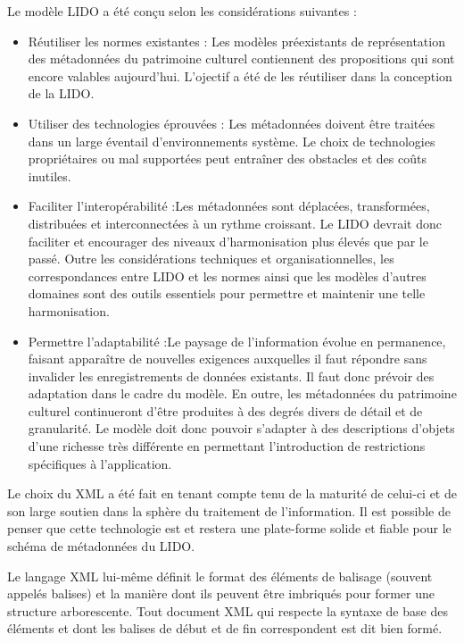 Le modèle LIDO a été conçu selon les considérations suivantes :

\begin{itemize}
    \item Réutiliser les normes existantes : Les modèles préexistants de représentation des métadonnées du patrimoine culturel contiennent des propositions qui sont encore valables aujourd'hui. L'ojectif  a été de les réutiliser dans la conception de la LIDO. 
    \item Utiliser des technologies éprouvées : Les métadonnées doivent être traitées dans un large éventail d'environnements système. Le choix de technologies propriétaires ou mal supportées peut entraîner des obstacles et des coûts inutiles.
    \item Faciliter l'interopérabilité  :Les métadonnées sont déplacées, transformées, distribuées et interconnectées à un rythme croissant. Le LIDO devrait donc faciliter et encourager des niveaux d'harmonisation plus élevés que par le passé. Outre les considérations techniques et organisationnelles, les correspondances entre LIDO et les normes ainsi que les modèles d'autres domaines sont des outils essentiels pour permettre et maintenir une telle harmonisation.
    \item Permettre l'adaptabilité :Le paysage de l'information évolue en permanence, faisant apparaître de nouvelles exigences auxquelles il faut répondre sans invalider les enregistrements de données existants. Il faut donc prévoir des adaptation dans le cadre du modèle. En outre, les métadonnées du patrimoine culturel continueront d'être produites à des degrés divers de détail et de granularité. Le modèle doit donc pouvoir s'adapter à des descriptions d'objets d'une richesse très différente en permettant l'introduction de restrictions spécifiques à l'application.
\end{itemize} 
Le choix du XML a été fait en tenant compte tenu de la maturité de celui-ci et de son large soutien dans la sphère du traitement de l'information. Il est possible de penser que cette technologie est et restera une plate-forme solide et fiable pour le schéma de métadonnées du LIDO.\newline

Le langage XML lui-même définit le format des éléments de balisage (souvent appelés balises) et la manière dont ils peuvent être imbriqués pour former une structure arborescente. Tout document XML qui respecte la syntaxe de base des éléments et dont les balises de début et de fin correspondent est dit bien formé.

